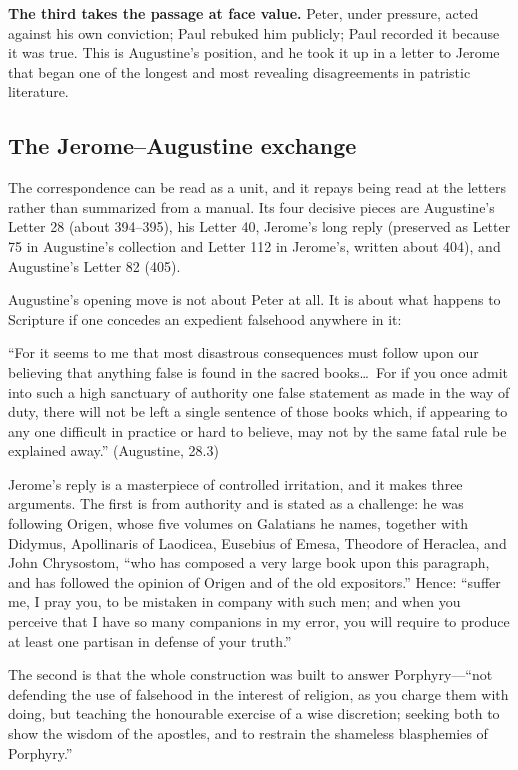 \textbf{The third takes the passage at face value.} Peter, under pressure,
acted against his own conviction; Paul rebuked him publicly; Paul recorded it
because it was true. This is Augustine's position, and he took it up in a
letter to Jerome that began one of the longest and most revealing
disagreements in patristic literature.

\subsection{The Jerome--Augustine exchange}

The correspondence can be read as a unit, and it repays being read at the
letters rather than summarized from a manual. Its four decisive pieces are
Augustine's Letter 28 (about 394--395), his Letter 40, Jerome's long reply
(preserved as Letter 75 in Augustine's collection and Letter 112 in Jerome's,
written about 404), and Augustine's Letter 82 (405).

Augustine's opening move is not about Peter at all. It is about what happens
to Scripture if one concedes an expedient falsehood anywhere in it:

\begin{studyframe}\small
``For it seems to me that most disastrous consequences must follow upon our
believing that anything false is found in the sacred books\ldots\ For if you
once admit into such a high sanctuary of authority one false statement as
made in the way of duty, there will not be left a single sentence of those
books which, if appearing to any one difficult in practice or hard to
believe, may not by the same fatal rule be explained away.''
(Augustine,  28.3)
\end{studyframe}

Jerome's reply is a masterpiece of controlled irritation, and it makes three
arguments. The first is from authority and is stated as a challenge: he was
following Origen, whose five volumes on Galatians he names, together with
Didymus, Apollinaris of Laodicea, Eusebius of Emesa, Theodore of Heraclea,
and John Chrysostom, ``who has composed a very large book upon this
paragraph, and has followed the opinion of Origen and of the old
expositors.'' Hence: ``suffer me, I pray you, to be mistaken in company with
such men; and when you perceive that I have so many companions in my error,
you will require to produce at least one partisan in defense of your truth.''

The second is that the whole construction was built to answer Porphyry---``not
defending the use of falsehood in the interest of religion, as you charge
them with doing, but teaching the honourable exercise of a wise discretion;
seeking both to show the wisdom of the apostles, and to restrain the
shameless blasphemies of Porphyry.''

